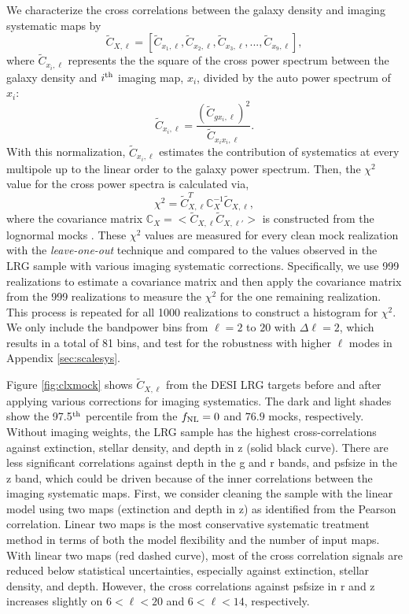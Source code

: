 We characterize the cross correlations between the galaxy density and imaging systematic maps by
\begin{equation}
\tilde{C}_{X, \ell} = [\tilde{C}_{x_{1}, \ell}, \tilde{C}_{x_{2}, \ell}, \tilde{C}_{x_{3}, \ell}, ..., \tilde{C}_{x_{9}, \ell}],
\end{equation}
where $\tilde{C}_{x_{i}, \ell}$ represents the the square of the cross power spectrum between the galaxy density and $i^{\rm th}$ imaging map, $x_{i}$, divided by the auto power spectrum of $x_{i}$:
\begin{equation}\label{eq:cx}
\tilde{C}_{x_{i}, \ell} = \frac{(\tilde{C}_{gx_{i}, \ell})^{2}}{\tilde{C}_{x_{i}x_{i},\ell}}.
\end{equation}
With this normalization, $\tilde{C}_{x_{i}, \ell}$ estimates the contribution of systematics at every multipole up to the linear order to the galaxy power spectrum. Then, the $\chi^{2}$ value for the cross power spectra is calculated via,
\begin{equation}\label{eq:cx_chi2}
\chi^{2} = \tilde{C}^{T}_{X, \ell} \mathbb{C}_{X}^{-1} \tilde{C}_{X, \ell},
\end{equation}
where the covariance matrix $\mathbb{C}_{X} = < \tilde{C}_{X, \ell} \tilde{C}_{X, \ell'} >$ is constructed from the lognormal mocks . These $\chi^{2}$ values are measured for every clean mock realization with the \textit{leave-one-out} technique and compared to the values observed in the LRG sample with various imaging systematic corrections. Specifically, we use 999 realizations to estimate a covariance matrix and then apply the covariance matrix from the 999 realizations to measure the $\chi^{2}$ for the one remaining realization. This process is repeated for all 1000 realizations to construct a histogram for $\chi^{2}$. We only include the bandpower bins from $\ell=2$ to $20$ with $\Delta\ell=2$, which results in a total of 81 bins, and test for the robustness with higher $\ell$ modes in Appendix \ref{sec:scalesys}. 

Figure \ref{fig:clxmock} shows $\tilde{C}_{X,\ell}$ from the DESI LRG targets before and after applying various corrections for imaging systematics. The dark and light shades show the 97.5$^{\rm th}$ percentile from the $f_{\rm NL}=0$ and $76.9$ mocks, respectively. Without imaging weights, the LRG sample has the highest cross-correlations against extinction, stellar density, and depth in z (solid black curve). There are less significant correlations against depth in the g and r bands, and psfsize in the z band, which could be driven because of the inner correlations between the imaging systematic maps. First, we consider cleaning the sample with the linear model using two maps (extinction and depth in z) as identified from the Pearson correlation. Linear two maps is the most conservative systematic treatment method in terms of both the model flexibility and the number of input maps. With linear two maps (red dashed curve), most of the cross correlation signals are reduced below statistical uncertainties, especially against extinction, stellar density, and depth. However, the cross correlations against psfsize in r and z increases slightly on $6<\ell<20$ and $6<\ell<14$, respectively. 

